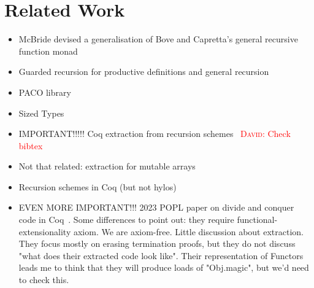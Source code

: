 \documentclass{article}
\newcommand{\dcas}[1]{\textcolor{red}{\textsc{David}: #1}}
\begin{document}
\section{Related Work}

\begin{itemize}
  \item McBride devised a generalisation of Bove and Capretta's general
recursive function monad~\cite{McBride15, BoveC01}
  \item Guarded recursion for productive definitions and general recursion
~\cite{AtkeyM13, PaviottiMB15}
  \item PACO library~\cite{HurNDV13}
  \item Sized Types \cite{AbelPTS13, AbelP16}
  \item IMPORTANT!!!!! Coq extraction from recursion
    schemes~\cite{larchey2022braga} \dcas{Check bibtex}
  \item Not that related: extraction for mutable arrays~\cite{SAKAGUCHI2020102372}
  \item Recursion schemes in Coq (but not hylos)~\cite{MurataE19}
  \item EVEN MORE IMPORTANT!!! 2023 POPL paper on divide and conquer code in
    Coq~\cite{AbreuDHJMS23}.  Some differences to point out: they require
    functional-extensionality axiom. We are axiom-free. Little discussion about
    extraction. They focus mostly on erasing termination proofs, but they do
    not discuss "what does their extracted code look like". Their
    representation of Functors leads me to think that they will produce loads
    of "Obj.magic", but we'd need to check this. 
\end{itemize}

\printbibliography[heading=bibintoc]
\end{document}
